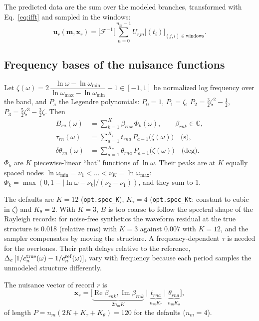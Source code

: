 \documentclass[11pt]{article}
\newcommand{\Ifft}{\mathcal{F}^{-1}}
\newcommand{\Real}{\operatorname{Re}}
\newcommand{\Imag}{\operatorname{Im}}
\begin{document}
The predicted data are the sum over the modeled branches, transformed with
Eq.~\eqref{eq:ifft} and sampled in the windows:
\begin{equation}
  \mathbf{u}_r(\mathbf{m},\mathbf{x}_r)=\Big[\Ifft\Big[\sum_{n=0}^{n_m-1}U_{rjn}\Big](t_i)\Big]_{(j,i)\in\text{windows}} .
\end{equation}

\subsection{Frequency bases of the nuisance functions}
Let $\zeta(\omega)=2\,\dfrac{\ln\omega-\ln\omega_{\min}}{\ln\omega_{\max}-\ln\omega_{\min}}-1\in[-1,1]$
be normalized log frequency over the band, and $P_a$ the Legendre
polynomials: $P_0=1$, $P_1=\zeta$, $P_2=\tfrac32\zeta^2-\tfrac12$,
$P_3=\tfrac52\zeta^3-\tfrac32\zeta$. Then
\begin{align}
  B_{rn}(\omega)&=\sum_{k=1}^{K}\beta_{rnk}\,\Phi_k(\omega),\qquad \beta_{rnk}\in\mathbb{C},\\
  \tau_{rn}(\omega)&=\sum_{a=1}^{K_\tau}t_{rna}\,P_{a-1}\big(\zeta(\omega)\big)\quad\text{(s)},\\
  \delta\theta_{rn}(\omega)&=\sum_{a=1}^{K_\theta}\theta_{rna}\,P_{a-1}\big(\zeta(\omega)\big)\quad\text{(deg)} .
\end{align}
$\Phi_k$ are $K$ piecewise-linear ``hat'' functions of $\ln\omega$. Their
peaks are at $K$ equally spaced nodes $\ln\omega_{\min}=\nu_1<\dots<\nu_K=\ln\omega_{\max}$:
$\Phi_k=\max(0,1-|\ln\omega-\nu_k|/(\nu_2-\nu_1))$, and they sum to 1.

The defaults are $K=12$ (\texttt{opt.spec\_K}), $K_\tau=4$
(\texttt{opt.spec\_Kt}: constant to cubic in $\zeta$) and $K_\theta=2$.
With $K=3$, $B$ is too coarse to follow the spectral shape of the Rayleigh
records: for noise-free synthetics the waveform residual at the true
structure is 0.018 (relative rms) with $K=3$ against 0.007 with $K=12$, and
the sampler compensates by moving the structure. A frequency-dependent $\tau$ is
needed for the overtones. Their path delays relative to the reference,
$\Delta_e\,[1/c^{\rm true}_n(\omega)-1/c^{\rm ref}_n(\omega)]$, vary with
frequency because each period samples the unmodeled structure differently.

The nuisance vector of record $r$ is
\begin{equation}
 \mathbf{x}_r=\big[\underbrace{\Real\beta_{rnk},\Imag\beta_{rnk}}_{2n_mK}\;\big|\;\underbrace{t_{rna}}_{n_mK_\tau}\;\big|\;\underbrace{\theta_{rna}}_{n_mK_\theta}\big],
\end{equation}
of length $P=n_m(2K+K_\tau+K_\theta)=120$ for the defaults ($n_m=4$).
\end{document}
